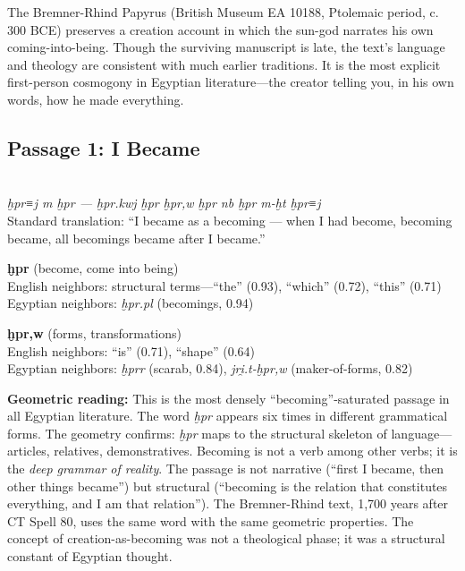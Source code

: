 \documentclass[11pt, a4paper]{article}
\newcommand{\passagehiero}[1]{{\normalfont\hierofont\fontsize{14}{17}\selectfont #1}}
\begin{document}
The Bremner-Rhind Papyrus (British Museum EA 10188, Ptolemaic period, c.\,300 BCE) preserves a creation account in which the sun-god narrates his own coming-into-being. Though the surviving manuscript is late, the text's language and theology are consistent with much earlier traditions. It is the most explicit first-person cosmogony in Egyptian literature---the creator telling you, in his own words, how he made everything.

\subsection{Passage 1: I Became}

{\color{passage}\passagehiero{𓆣𓂋𓇋 𓅓 𓆣𓂋 --- 𓆣𓂋 𓆣𓂋 𓆣𓂋𓅱𓏥 𓆣𓂋 𓎟 𓆣𓂋 𓅓𓐍𓏏 𓆣𓂋𓇋}\\\medskip
\textit{\small ḫpr≡j m ḫpr --- ḫpr.kwj ḫpr ḫpr,w ḫpr nb ḫpr m-ḫt ḫpr≡j}\\
Standard translation: ``I became as a becoming --- when I had become, becoming became, all becomings became after I became.''}

\bigskip

\noindent\textbf{ḫpr} (become, come into being)\\
English neighbors: structural terms---``the'' (0.93), ``which'' (0.72), ``this'' (0.71)\\
Egyptian neighbors: \textit{ḫpr.pl} (becomings, 0.94)

\medskip

\noindent\textbf{ḫpr,w} (forms, transformations)\\
English neighbors: ``is'' (0.71), ``shape'' (0.64)\\
Egyptian neighbors: \textit{ḫprr} (scarab, 0.84), \textit{jri̯.t-ḫpr,w} (maker-of-forms, 0.82)

\medskip

{\color{insight}\textbf{Geometric reading:}} This is the most densely ``becoming''-saturated passage in all Egyptian literature. The word \textit{ḫpr} appears six times in different grammatical forms. The geometry confirms: \textit{ḫpr} maps to the structural skeleton of language---articles, relatives, demonstratives. Becoming is not a verb among other verbs; it is the \textit{deep grammar of reality}. The passage is not narrative (``first I became, then other things became'') but structural (``becoming is the relation that constitutes everything, and I am that relation''). The Bremner-Rhind text, 1,700 years after CT Spell 80, uses the same word with the same geometric properties. The concept of creation-as-becoming was not a theological phase; it was a structural constant of Egyptian thought.
\end{document}
